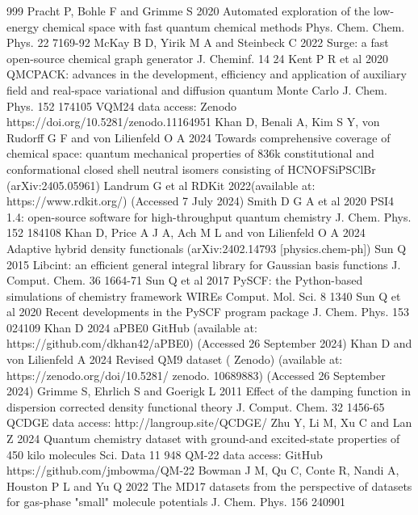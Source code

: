 \documentclass[12pt]{article}
\begin{document}
\begin{thebibliography}{999}
 Pracht P, Bohle F and Grimme S 2020 Automated exploration of the low-energy chemical space with fast quantum chemical methods Phys. Chem. Chem. Phys. 22 7169-92
 McKay B D, Yirik M A and Steinbeck C 2022 Surge: a fast open-source chemical graph generator J. Cheminf. 14 24
 Kent P R et al 2020 QMCPACK: advances in the development, efficiency and application of auxiliary field and real-space variational and diffusion quantum Monte Carlo J. Chem. Phys. 152 174105
 VQM24 data access: Zenodo https://doi.org/10.5281/zenodo.11164951
 Khan D, Benali A, Kim S Y, von Rudorff G F and von Lilienfeld O A 2024 Towards comprehensive coverage of chemical space: quantum mechanical properties of 836k constitutional and conformational closed shell neutral isomers consisting of HCNOFSiPSClBr (arXiv:2405.05961)
 Landrum G et al RDKit 2022(available at: https://www.rdkit.org/) (Accessed 7 July 2024)
 Smith D G A et al 2020 PSI4 1.4: open-source software for high-throughput quantum chemistry J. Chem. Phys. 152 184108
 Khan D, Price A J A, Ach M L and von Lilienfeld O A 2024 Adaptive hybrid density functionals (arXiv:2402.14793 [physics.chem-ph])
 Sun Q 2015 Libcint: an efficient general integral library for Gaussian basis functions J. Comput. Chem. 36 1664-71
 Sun Q et al 2017 PySCF: the Python-based simulations of chemistry framework WIREs Comput. Mol. Sci. 8 1340
 Sun Q et al 2020 Recent developments in the PySCF program package J. Chem. Phys. 153 024109
 Khan D 2024 aPBE0 GitHub (available at: https://github.com/dkhan42/aPBE0) (Accessed 26 September 2024)
 Khan D and von Lilienfeld A 2024 Revised QM9 dataset ( Zenodo) (available at: https://zenodo.org/doi/10.5281/ zenodo. 10689883) (Accessed 26 September 2024)
 Grimme S, Ehrlich S and Goerigk L 2011 Effect of the damping function in dispersion corrected density functional theory J. Comput. Chem. 32 1456-65
 QCDGE data access: http://langroup.site/QCDGE/
 Zhu Y, Li M, Xu C and Lan Z 2024 Quantum chemistry dataset with ground-and excited-state properties of 450 kilo molecules Sci. Data 11 948
 QM-22 data access: GitHub https://github.com/jmbowma/QM-22
 Bowman J M, Qu C, Conte R, Nandi A, Houston P L and Yu Q 2022 The MD17 datasets from the perspective of datasets for gas-phase "small" molecule potentials J. Chem. Phys. 156 240901

\end{thebibliography}
\end{document}
